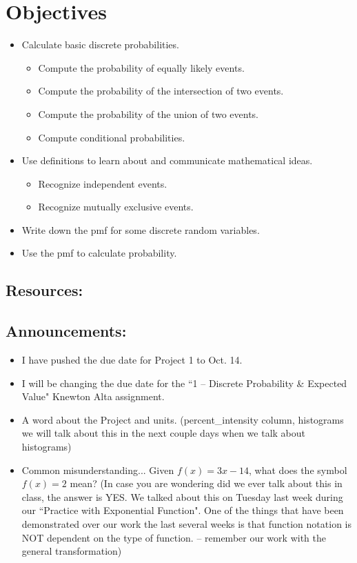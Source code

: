 \documentclass{article}
\theoremstyle{plain}
\theoremstyle{box}
\begin{document}
\section{Objectives}
\begin{itemize}
\item Calculate basic discrete probabilities.
	\begin{itemize}
	\item Compute the probability of equally likely events.
	\item Compute the probability of the intersection of two events.
	\item Compute the probability of the union of two events.
	\item Compute conditional probabilities.
	\end{itemize}
\item Use definitions to learn about and communicate mathematical ideas.
	\begin{itemize}
	\item Recognize independent events.
	\item Recognize mutually exclusive events.
	\end{itemize}
\item Write down the pmf for some discrete random variables.
\item Use the pmf to calculate probability.
\end{itemize}
\subsection{Resources:}
\subsection{Announcements:}
\begin{itemize}
\item I have pushed the due date for Project 1 to Oct. 14.
\item I will be changing the due date for the ``1 -- Discrete Probability \& Expected Value" Knewton Alta assignment.
\item A word about the Project and units. (percent\_intensity column, histograms we will talk about this in the next couple days when we talk about histograms)
\item Common misunderstanding... Given $f(x) = 3x-14$, what does the symbol $f(x) = 2$ mean? (In case you are wondering did we ever talk about this in class, the answer is YES. We talked about this on Tuesday last week during our ``Practice with Exponential Function". One of the things that have been demonstrated over our work the last several weeks is that function notation is NOT dependent on the type of function. -- remember our work with the general transformation)
\end{itemize}
\end{document}
